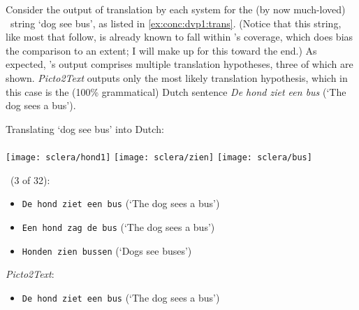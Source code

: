 Consider the output of translation by each system for the (by now much-loved)
\sclera\ string `dog see bus', as listed in \cref{ex:conc:dvp1:trans}. (Notice
that this string, like most that follow, is already known to fall within
\depicto's coverage, which does bias the comparison to an extent; I will make
up for this toward the end.) As expected, \depicto's output comprises multiple
translation hypotheses, three of which are shown. \emph{Picto2Text} outputs
only the most likely translation hypothesis, which in this case is the (100\%
grammatical) Dutch sentence \emph{De hond ziet een bus} (`The dog sees a bus').

\begin{exe}
    \ex \label{ex:conc:dvp1:trans} Translating `dog see bus' into Dutch: \\\\
     {\texttt{[image: sclera/hond1]}\hspace{0.5cm}}
     {\texttt{[image: sclera/zien]}\hspace{0.5cm}}
     {\texttt{[image: sclera/bus]}\hspace{0.5cm}}
    \begin{xlist}
        \ex \depicto\ (3 of 32):
            \begin{itemize}
                \item \texttt{De hond ziet een bus} (`The dog sees a bus')
                \item \texttt{Een hond zag de bus} (`The dog sees a bus')
                \item \texttt{Honden zien bussen} (`Dogs see buses')
            \end{itemize}
        \ex \emph{Picto2Text}:
            \begin{itemize}
                \item \texttt{De hond ziet een bus} (`The dog sees a bus')
            \end{itemize}
    \end{xlist}
\end{exe}

